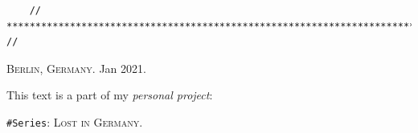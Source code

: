 \documentclass[12pt]{article}
\numberwithin{equation}{section}
\begin{document}
\begin{figure}[H]
    \centering
    \qquad
\end{figure}

\begin{verbatim}
    // ************************************************************************* //
\end{verbatim}

\begin{flushright}
    \textsc{Berlin, Germany}. Jan 2021.
    
    This text is a part of my \textit{personal project}: 
    
    \texttt{\#Series}: \textsc{Lost in Germany}.
\end{flushright}

\end{document}
